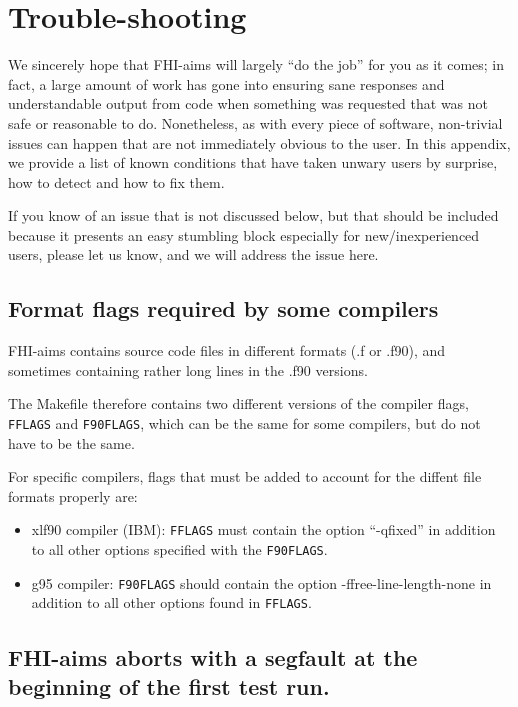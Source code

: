 \chapter{Trouble-shooting}
\label{appendix_trouble_shooting}

We sincerely hope that FHI-aims will largely ``do the job'' for you as
it comes; in fact, a large amount of work has gone into ensuring sane 
responses and understandable output from code when something was
requested that was not safe or reasonable to do. Nonetheless, as with
every piece of software, non-trivial issues can happen that are not
immediately obvious to the user. In this appendix, we provide a list
of known conditions that have taken unwary users by surprise, how to
detect and how to fix them.

If you know of an issue that is not discussed below, but that should
be included because it presents an easy stumbling block especially for
new/inexperienced users, please let us know, and we will address the
issue here.

\section{Format flags required by some compilers}

FHI-aims contains source code files in different formats (.f or .f90),
and sometimes containing rather long lines in the .f90 versions. 

The Makefile therefore contains two different versions of the compiler
flags, \texttt{FFLAGS} and \texttt{F90FLAGS}, which can be the same
for some compilers, but do not have to be the same.

For specific compilers, flags that must be added to account for the
diffent file formats properly are:
\begin{itemize}
  \item xlf90 compiler (IBM): \texttt{FFLAGS} must contain the option
    ``-qfixed'' in addition to all other options specified with the
    \texttt{F90FLAGS}. 
  \item g95 compiler: \texttt{F90FLAGS} should contain the option
    -ffree-line-length-none in addition to all other options found in
    \texttt{FFLAGS}.
\end{itemize}

\section{FHI-aims aborts with a segfault at the beginning of the
  first test run.}

